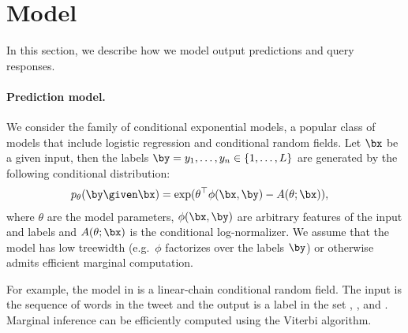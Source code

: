 \section{Model}
\label{sec:model}

In this section, we describe how we model output predictions and query responses.


\paragraph{Prediction model.}
We consider the family of conditional exponential models, a popular class of models that include logistic regression and conditional random fields.
Let $\bx$ be a given input, then the labels $\by = y_1, \ldots, y_n \in \{1, \dots, L\}$ are generated by the following conditional distribution:
\begin{align*}
  \p(\by \given \bx) 
  &= \exp( \theta^\top \phi(\bx, \by) - A(\theta; \bx)),
\end{align*}
where $\theta$ are the model parameters,
$\phi(\bx, \by)$ are arbitrary features of the input and labels and 
$A(\theta; \bx)$ is the conditional log-normalizer.
We assume that the model has low treewidth (e.g.\ $\phi$ factorizes over the labels $\by$) or otherwise admits efficient marginal computation.

For example, the model in  is a linear-chain conditional random field. The input is the sequence of words in the tweet and the output is a label in the set \scnone, \scres, \scloc{} and \scper. Marginal inference can be efficiently computed using the Viterbi algorithm.


